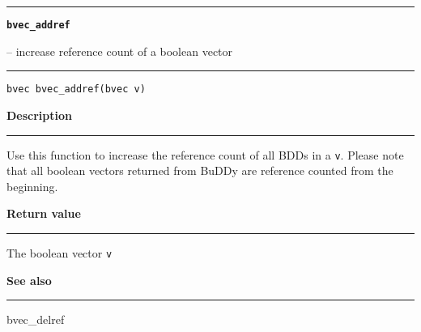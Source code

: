 \begin{minipage}{\textwidth}

\noindent\begin{minipage}{\textwidth}
\rule{\textwidth}{0.5mm}
{\tt\bf bvec\_addref }
\--- increase reference count of a boolean vector  \hspace{\fill}
\\\rule[1.5ex]{\textwidth}{0.5mm}
\end{minipage}

\noindent\begin{verbatim}
bvec bvec_addref(bvec v) 
\end{verbatim}

\vspace{\parsep}\noindent
{\bf Description}\\\rule[1.5ex]{\textwidth}{0.2mm}\vspace{-1.5ex}\setlength{\parindent}{1em}
Use this function to increase the reference count of all BDDs
           in a {\tt v}. Please note that all boolean vectors returned
	   from BuDDy are reference counted from the beginning. 

\setlength{\parindent}{0em}\vspace{\parsep}\vspace{\baselineskip}\noindent
{\bf Return value}\\\rule[1.5ex]{\textwidth}{0.2mm}\vspace{-1.5ex}
The boolean vector {\tt v} 

\vspace{\parsep}\vspace{\baselineskip}\noindent
{\bf See also}\\\rule[1.5ex]{\textwidth}{0.2mm}\vspace{-1.5ex}
bvec\_delref 
\end{minipage}
\vspace{8ex}
